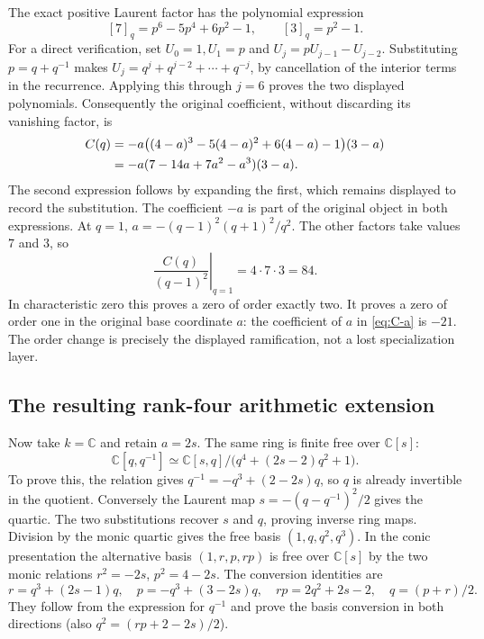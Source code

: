 The exact positive Laurent factor has the polynomial expression
\[
 [7]_q=p^6-5p^4+6p^2-1,\qquad [3]_q=p^2-1.
\]
For a direct verification, set $U_0=1,U_1=p$ and
$U_j=pU_{j-1}-U_{j-2}$. Substituting $p=q+q^{-1}$ makes
$U_j=q^j+q^{j-2}+\cdots+q^{-j}$, by cancellation of the interior
terms in the recurrence. Applying this through $j=6$ proves the
two displayed polynomials.
Consequently the original coefficient, without discarding its
vanishing factor, is
\begin{align}
 C(q)&=-a\bigl((4-a)^3-5(4-a)^2+6(4-a)-1\bigr)(3-a)\notag\\
     &=-a(7-14a+7a^2-a^3)(3-a).
 \label{eq:C-a}
\end{align}
The second expression follows by expanding the first, which remains
displayed to record the substitution.
The coefficient $-a$ is part of the original object in both expressions.
At $q=1$, $a=-(q-1)^2(q+1)^2/q^2$.
The other factors take values $7$ and $3$, so
\[
 \left.\frac{C(q)}{(q-1)^2}\right|_{q=1}=4\cdot7\cdot3=84.
\]
In characteristic zero this proves a zero of order exactly two.
It proves a zero of order one in the original base coordinate $a$:
the coefficient of $a$ in \eqref{eq:C-a} is $-21$.
The order change is precisely the displayed ramification, not a
lost specialization layer.

\subsection{The resulting rank-four arithmetic extension}
Now take $k=\mathbb C$ and retain $a=2s$.
The same ring is finite free over $\mathbb C[s]$:
\begin{equation}\label{eq:quartic-q}
 \mathbb C[q,q^{-1}]
 \simeq\mathbb C[s,q]/\bigl(q^4+(2s-2)q^2+1\bigr).
\end{equation}
To prove this, the relation gives
$q^{-1}=-q^3+(2-2s)q$, so $q$ is already invertible in the quotient.
Conversely the Laurent map $s=-(q-q^{-1})^2/2$ gives the quartic.
The two substitutions recover $s$ and $q$, proving inverse ring maps.
Division by the monic quartic gives the free basis $(1,q,q^2,q^3)$.
In the conic presentation the alternative basis $(1,r,p,rp)$ is
free over $\mathbb C[s]$ by the two monic relations
$r^2=-2s$, $p^2=4-2s$.
The conversion identities are
\[
 r=q^3+(2s-1)q,\quad
 p=-q^3+(3-2s)q,\quad rp=2q^2+2s-2,\quad q=(p+r)/2.
\]
They follow from the expression for $q^{-1}$ and prove the basis
conversion in both directions (also $q^2=(rp+2-2s)/2$).

